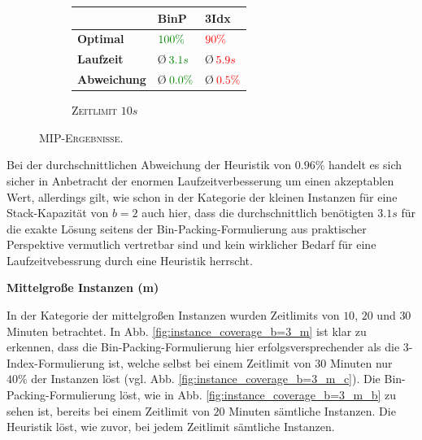 \begin{figure}[H]
\begin{subfigure}[b]{0.3\textwidth}
{\begin{tabular}{ | l | l | l |}
    \hline
     & \textbf{BinP} & \textbf{3Idx} \\ \hline
    \textbf{Optimal} & $ \textcolor{mygreen}{100 \%}$ & $ \textcolor{red}{90 \%}$ \\ \hline
    \textbf{Laufzeit} & \O $\thinspace \textcolor{mygreen}{3.1 s}$ & \O $\thinspace \textcolor{red}{5.9 s}$ \\ \hline
    \textbf{Abweichung} & \O $\thinspace \textcolor{mygreen}{0.0 \%}$ & \O $\thinspace \textcolor{red}{0.5 \%}$ \\ \hline
\end{tabular}}
\caption{\textsc{Zeitlimit} $10s$}
\label{}
\end{subfigure}
\caption{\textsc{MIP-Ergebnisse.}}
\label{fig:mip_results_b=3_s}
\end{figure}

Bei der durchschnittlichen Abweichung der Heuristik von $0.96 \%$ handelt es sich sicher in Anbetracht
der enormen Laufzeitverbesserung um einen akzeptablen Wert, allerdings gilt, wie schon in der Kategorie
der kleinen Instanzen für eine Stack-Kapazität von $b = 2$ auch hier, dass die durchschnittlich benötigten $3.1s$
für die exakte Lösung seitens der Bin-Packing-Formulierung aus praktischer Perspektive vermutlich vertretbar sind
und kein wirklicher Bedarf für eine Laufzeitvebessrung durch eine Heuristik herrscht.

\textbf{Mittelgroße Instanzen (m)}

In der Kategorie der mittelgroßen Instanzen wurden Zeitlimits von $10$, $20$ und $30$ Minuten betrachtet.
In Abb. \ref{fig:instance_coverage_b=3_m} ist klar zu erkennen, dass die Bin-Packing-Formulierung hier erfolgsversprechender
als die 3-Index-Formulierung ist, welche selbst bei einem Zeitlimit von $30$ Minuten nur $40 \%$ der Instanzen löst
(vgl. Abb. \ref{fig:instance_coverage_b=3_m_c}). Die Bin-Packing-Formulierung löst, wie in Abb. \ref{fig:instance_coverage_b=3_m_b} zu sehen
ist, bereits bei einem Zeitlimit von $20$ Minuten sämtliche Instanzen.
Die Heuristik löst, wie zuvor, bei jedem Zeitlimit sämtliche Instanzen.

